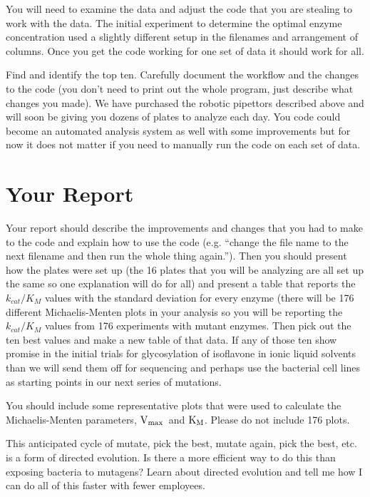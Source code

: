 \documentclass[]{tufte-handout}
\newcommand{\Km}{$\rm K_M$}
\newcommand{\Vmax}{$\rm V_{max}$}
\begin{document}
You will need to examine the data and adjust the code that you are stealing to work with the data. The initial experiment to determine the optimal enzyme concentration used a slightly different setup in the filenames and arrangement of columns. Once you get the code working for one set of data it should work for all.

Find and identify the top ten. Carefully document the workflow and the changes to the code (you don't need to print out the whole program, just describe what changes you made). We have purchased the robotic pipettors described above and will soon be giving you dozens of plates to analyze each day. You code could become an automated analysis system as well with some improvements but for now it does not matter if you need to manually run the code on each set of data.

\section{Your Report} 

Your report should describe the improvements and changes that you had to make to the code and explain how to use the code (e.g. ``change the file name to the next filename and then run the whole thing again.''). Then you should present how the plates were set up (the 16 plates that you will be analyzing are all set up the same so one explanation will do for all) and present a table that reports the $k_{cat}/K_M$ values with the standard deviation for every enzyme (there will be 176 different Michaelis-Menten plots in your analysis so you will be reporting the $k_{cat}/K_M$ values from 176 experiments with mutant enzymes. Then pick out the ten best values and make a new table of that data. If any of those ten show promise in the initial trials for glycosylation of isoflavone in ionic liquid solvents than we will send them off for sequencing and perhaps use the bacterial cell lines as starting points in our next series of mutations. 

You should include some representative plots that were used to calculate the Michaelis-Menten parameters, \Vmax\ and \Km. Please do not include 176 plots.

This anticipated cycle of mutate, pick the best, mutate again, pick the best, etc. is a form of directed evolution. Is there a more efficient way to do this than exposing bacteria to mutagens? Learn about directed evolution and tell me how I can do all of this faster with fewer employees.
\end{document}

